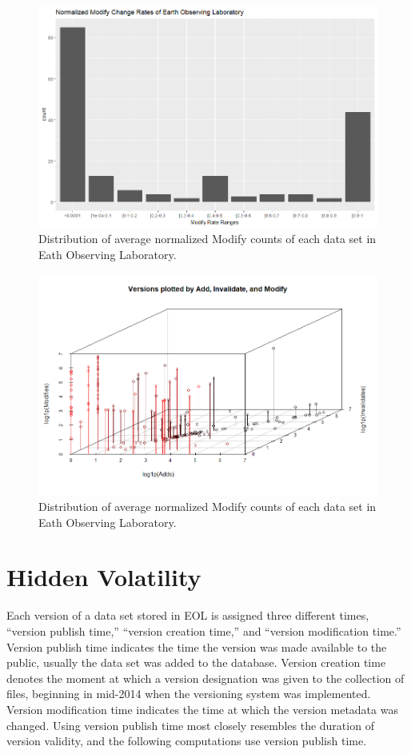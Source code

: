 \begin{figure}%
	\centering
	\includegraphics[scale=.6]{figures/Eol_Mod.png}
	\caption{Distribution of average normalized Modify counts of each data set in Eath Observing Laboratory.}
	\label{EOL_Mods}
\end{figure}

\begin{figure}%
	\centering
	\includegraphics[scale=.6]{figures/Eol_Versions_3d.png}
	\caption{Distribution of average normalized Modify counts of each data set in Eath Observing Laboratory.}
	\label{EOL_AIM}
\end{figure}

\section{Hidden Volatility}

Each version of a data set stored in EOL is assigned three different times, “version publish time,” “version creation time,” and “version modification time.”  
Version publish time indicates the time the version was made available to the public, usually the data set was added to the database.  
Version creation time denotes the moment at which a version designation was given to the collection of files, beginning in mid-2014 when the versioning system was implemented.  
Version modification time indicates the time at which the version metadata was changed.  
Using version publish time most closely resembles the duration of version validity, and the following computations use version publish time.

